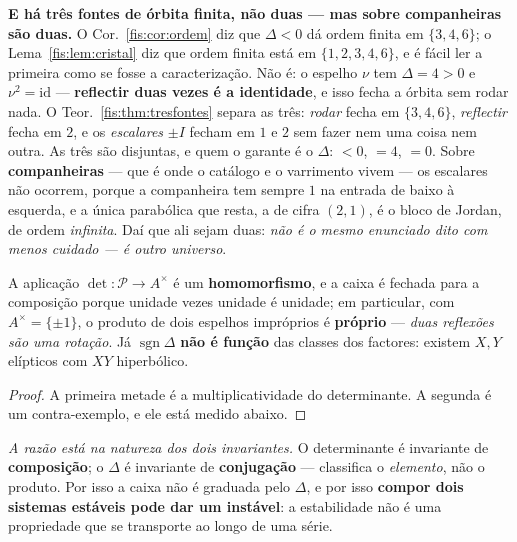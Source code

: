 \documentclass[livro.tex]{subfiles}
\begin{document}
\medskip\noindent\textbf{E há três fontes de órbita finita, não duas --- mas
sobre companheiras são duas.} O Cor.~\ref{fis:cor:ordem} diz que $\Delta<0$ dá
ordem finita em $\{3,4,6\}$; o Lema~\ref{fis:lem:cristal} diz que ordem finita
está em $\{1,2,3,4,6\}$, e é fácil ler a primeira como se fosse a caracterização.
Não é: o espelho $\nu$ tem $\Delta=4>0$ e $\nu^{2}=\mathrm{id}$ ---
\textbf{reflectir duas vezes é a identidade}, e isso fecha a órbita sem rodar
nada. O Teor.~\ref{fis:thm:tresfontes} separa as três: \emph{rodar} fecha em
$\{3,4,6\}$, \emph{reflectir} fecha em $2$, e os \emph{escalares} $\pm I$ fecham
em $1$ e $2$ sem fazer nem uma coisa nem outra. As três são disjuntas, e quem o
garante é o $\Delta$: $<0$, $=4$, $=0$. Sobre \textbf{companheiras} --- que é
onde o catálogo e o varrimento vivem --- os escalares não ocorrem, porque a
companheira tem sempre $1$ na entrada de baixo à esquerda, e a única parabólica
que resta, a de cifra $(2,1)$, é o bloco de Jordan, de ordem \emph{infinita}. Daí
que ali sejam duas: \emph{não é o mesmo enunciado dito com menos cuidado --- é
outro universo}.
\begin{corolario}\label{fis:cor:serie}
A aplicação $\det\colon\mathcal{P}\to A^{\times}$ é um \textbf{homomorfismo}, e a
caixa é fechada para a composição porque unidade vezes unidade é unidade; em
particular, com $A^{\times}=\{\pm1\}$, o produto de dois espelhos impróprios é
\textbf{próprio} --- \emph{duas reflexões são uma rotação}. Já
$\operatorname{sgn}\Delta$ \textbf{não é função} das classes dos factores: existem
$X,Y$ elípticos com $XY$ hiperbólico.
\end{corolario}

\begin{proof}
A primeira metade é a multiplicatividade do determinante. A segunda é um
contra-exemplo, e ele está medido abaixo.
\end{proof}

\medskip\noindent \emph{A razão está na natureza dos dois invariantes.} O
determinante é invariante de \textbf{composição}; o $\Delta$ é invariante de
\textbf{conjugação} --- classifica o \emph{elemento}, não o produto. Por isso a
caixa não é graduada pelo $\Delta$, e por isso \textbf{compor dois sistemas
estáveis pode dar um instável}: a estabilidade não é uma propriedade que se
transporte ao longo de uma série.
\end{document}
